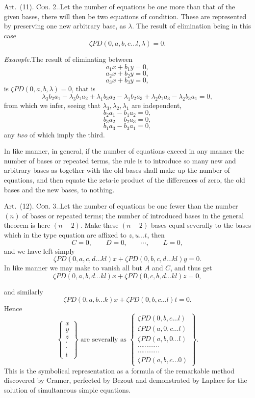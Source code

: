 \documentclass[11pt]{article}
\newcommand{\sourcepage}[1]{\marginpar{\scriptsize p.~#1}}
\newcommand{\corhead}[1]{\textsc{Cor. #1.}}
\newcommand{\art}[1]{\par\smallskip\noindent Art.~(#1).\quad}
\newcommand{\PD}{\mathit{PD}}
\begin{document}
\sourcepage{51}
\art{11} \corhead{2.}\quad Let the number of equations be one more than that of the given bases, there will then be two equations of condition. These are represented by preserving one new arbitrary base, as $\lambda$. The result of elimination being in this case
\[
 \zeta\PD(0,a,b,c\ldots l,\lambda)=0.
\]

\emph{Example.}\quad The result of eliminating between
\[
 a_1x+b_1y=0,
\]
\[
 a_2x+b_2y=0,
\]
\[
 a_3x+b_3y=0,
\]
is $\zeta\PD(0,a,b,\lambda)=0$, that is
\[
 \lambda_3b_2a_1-\lambda_3b_1a_2+\lambda_1b_3a_2-\lambda_1b_2a_3+\lambda_2b_1a_3-\lambda_2b_3a_1=0,
\]
from which we infer, seeing that $\lambda_3,\lambda_2,\lambda_1$ are independent,
\[
 b_2a_1-b_1a_2=0,
\]
\[
 b_3a_2-b_2a_3=0,
\]
\[
 b_1a_3-b_3a_1=0,
\]
any \emph{two} of which imply the third.

In like manner, in general, if the number of equations exceed in any manner the number of bases or repeated terms, the rule is to introduce so many new and arbitrary bases as together with the old bases shall make up the number of equations, and then equate the zeta-ic product of the differences of zero, the old bases and the new bases, to nothing.

\art{12} \corhead{3.}\quad Let the number of equations be one fewer than the number $(n)$ of bases or repeated terms; the number of introduced bases in the general theorem is here $(n-2)$. Make these $(n-2)$ bases equal severally to the bases which in the type equation are affixed to $z,u\ldots t$, then
\[
 C=0,
\qquad
 D=0,
\qquad
 \cdots,
\qquad
 L=0,
\]
and we have left simply
\[
 \zeta\PD(0,a,c,d\ldots kl)x+\zeta\PD(0,b,c,d\ldots kl)y=0.
\]
In like manner we may make to vanish all but $A$ and $C$, and thus get
\[
 \zeta\PD(0,a,b,d\ldots kl)x+\zeta\PD(0,c,b,d\ldots kl)z=0,
\]

\sourcepage{52}
and similarly
\[
 \zeta\PD(0,a,b\ldots k)x+\zeta\PD(0,b,c\ldots l)t=0.
\]
Hence
\[
\left\{\begin{array}{c}
 x\\ y\\ z\\ \cdot\\ \cdot\\ t
\end{array}\right\}
\text{ are severally as }
\left\{\begin{array}{c}
 \zeta\PD(0,b,c\ldots l)\\
 \zeta\PD(a,0,c\ldots l)\\
 \zeta\PD(a,b,0\ldots l)\\
 \cdots\cdots\cdots\cdots\\
 \cdots\cdots\cdots\cdots\\
 \zeta\PD(a,b,c\ldots0)
\end{array}\right\}.
\]
This is the symbolical representation as a formula of the remarkable method discovered by Cramer, perfected by Bezout and demonstrated by Laplace for the solution of simultaneous simple equations.
\end{document}
